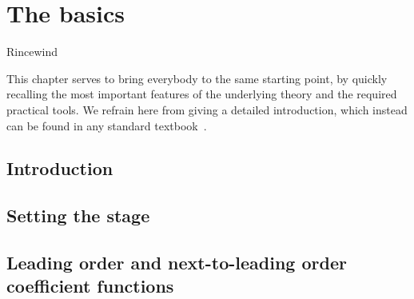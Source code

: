 
\chapter{The basics}
\label{chap:intro}

%
{Rincewind}



This chapter serves to bring everybody to the same starting point, by quickly recalling the most important features of the underlying theory and the required practical tools.
We refrain here from giving a detailed introduction, which instead can be found in any standard textbook~\cite{Leader:2011gpt,Leader:1996hm,Peskin:1995ev,Halzen:1984mc,Kronfeld:2010bx}.

\section{Introduction}


\section{Setting the stage}
\label{sec:xs}


\section{Leading order and next-to-leading order coefficient functions}
\label{sec:nlo}

